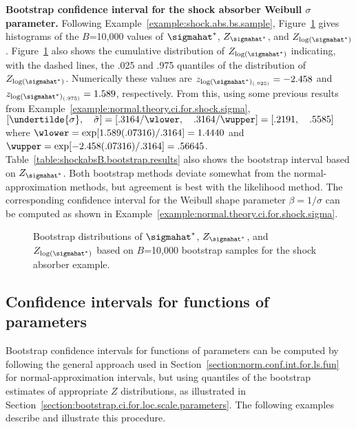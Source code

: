 \begin{example}
{\bf Bootstrap confidence interval for the shock absorber Weibull
$\sigma$ parameter.} Following Example~\ref{example:shock.abs.bs.sample},
Figure~\ref{figure:shockabsB.weib.boot.summary.sigma.ps} gives
histograms of the $B$=10,000 values of $\sigmahat^{*}$,
$Z_{\sigmahat^{*}}$, and $Z_{\log(\sigmahat^{*})}$.
Figure~\ref{figure:shockabsB.weib.boot.summary.sigma.ps} also shows the
cumulative distribution of $Z_{\log(\sigmahat^{*})}$ indicating, with
the dashed lines, the .025 and .975 quantiles of the
distribution of $Z_{\log(\sigmahat^{*})}$. Numerically these values
are $z_{\log(\sigmahat^{*})_{(.025)}} = -2.458$ and
$z_{\log(\sigmahat^{*})_{(.975)}}=1.589$, respectively.  From this,
using some previous results from
Example~\ref{example:normal.theory.ci.for.shock.sigma},
$[ \undertilde{\sigma}, \quad \tilde{\sigma}] =
[.3164/\wlower, \quad
.3164/\wupper] = [ .2191    , \quad  .5585 ]$
where $\wlower=\exp[1.589(.07316)/.3164]=1.4440$ and 
$\wupper=\exp[ -2.458  (.07316)/.3164] =.56645$.
Table~\ref{table:shockabsB.bootstrap.results} also shows the
bootstrap interval based on $Z_{\sigmahat^{*}}$. Both
bootstrap methods deviate somewhat from the normal-approximation
methods, but
agreement is best with the likelihood method. The corresponding
confidence interval for the Weibull shape parameter $\beta=1/\sigma$
can be computed as shown in
Example~\ref{example:normal.theory.ci.for.shock.sigma}.
\begin{figure}
\caption{Bootstrap distributions of $\sigmahat^{*}$,
$Z_{\sigmahat^{*}}$, and $Z_{\log(\sigmahat^{*})}$ based on $B$=10,000
bootstrap samples for the shock absorber example.}
\label{figure:shockabsB.weib.boot.summary.sigma.ps}
\end{figure}
\end{example}

\subsection{Confidence intervals for functions of parameters}
\label{section:par.boot.ci.f}
Bootstrap confidence intervals for functions of parameters can be
computed by following the general approach used in
Section~\ref{section:norm.conf.int.for.ls.fun} for
normal-approximation intervals, but using quantiles of the bootstrap
estimates of appropriate $Z$ distributions, as illustrated in
Section~\ref{section:bootstrap.ci.for.loc.scale.parameters}.  The
following examples describe and illustrate this procedure.

